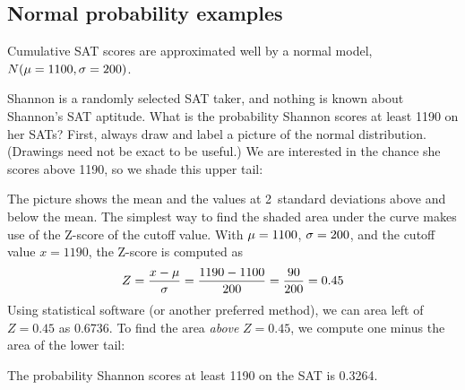 

\D{\newpage}

\subsection{Normal probability examples}
\label{normal_probability_examples}

\noindent%
Cumulative SAT scores are approximated well by a normal model,
$N(\mu = 1100{}, \sigma = 200{})$.

\newcommand{\shannonsat}{1190}
\newcommand{\shannonsatz}{0.45}
\begin{examplewrap}
\begin{nexample}{Shannon is a randomly selected SAT taker,
    and nothing is known about Shannon's SAT aptitude.
    What is the probability Shannon scores at least
    \shannonsat{} on her SATs?}
  \label{satAbove1190Exam}%
  First, always draw and label a picture of the normal
  distribution.
  (Drawings need not be exact to be useful.)
  We are interested in the chance she scores above
  \shannonsat{}, so we shade this upper tail:
  \begin{center}
  \end{center}
  The picture shows the mean and the values at
  2~standard deviations above and below the mean.
  The simplest way to find the shaded area under
  the curve makes use of the Z-score of the cutoff value.
  With $\mu = 1100{}$, $\sigma = 200{}$,
  and the cutoff value $x = \shannonsat{}$,
  the Z-score is computed as
  \begin{align*}
  Z = \frac{x - \mu}{\sigma}
    = \frac{\shannonsat{} - \satmean{}}{\satsd{}}
    = \frac{90}{\satsd{}}
    = \shannonsatz{}
  \end{align*}
  Using statistical software (or another preferred method),
  we can area left of $Z = \shannonsatz{}$ as 0.6736.
  To find the area \emph{above} $Z = \shannonsatz{}$,
  we compute one minus the area of the lower tail:
  \begin{center}
  \end{center}
  The probability Shannon scores at least 1190 on the SAT
  is 0.3264.
\end{nexample}
\end{examplewrap}

